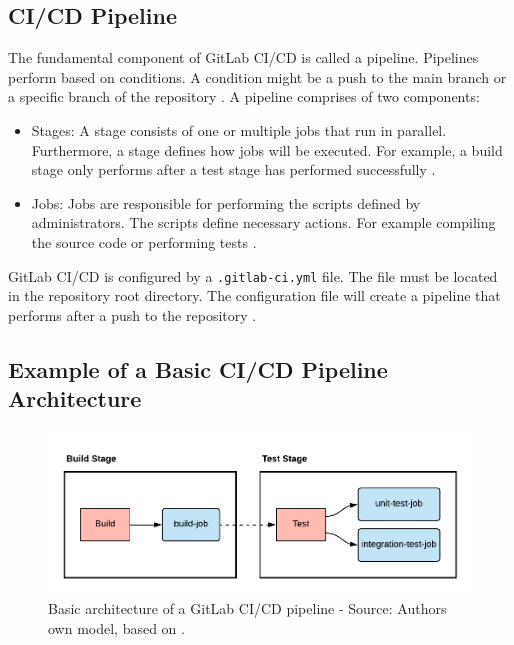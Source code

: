 \subsection{CI/CD Pipeline}
\label{subsec:04_background_gitlab_pipeline}
The fundamental component of GitLab CI/CD is called a pipeline. Pipelines perform based on conditions. A condition might be a push to the main branch or a specific branch of the repository \cite{Gitlab2020Docs}. A pipeline comprises of two components:

\begin{itemize}
\item Stages: A stage consists of one or multiple jobs that run in parallel. Furthermore, a stage defines how jobs will be executed. For example, a build stage only performs after a test stage has performed successfully \cite{Gitlab2020Docs}.

\item Jobs: Jobs are responsible for performing the scripts defined by administrators. The scripts define necessary actions. For example compiling the source code or performing tests \cite{Gitlab2020Docs}.
\end{itemize}


GitLab CI/CD is configured by a \texttt{.gitlab-ci.yml} file. The file must be located in the repository root directory.
The configuration file will create a pipeline that performs after a push to the repository \cite{Gitlab2020Docs}.


\subsection{Example of a Basic CI/CD Pipeline Architecture}
\label{subsec:04_background_gitlab_basic-pipeline}
\begin{figure}[h]
\centering
\includegraphics[scale=0.8]{images/04_technical_background/gitlab/basic_pipeline}
\caption{Basic architecture of a GitLab CI/CD pipeline - Source: Authors own model, based on \cite{Gitlab2020Docs}.}
\label{fig:04_gitlab_pipeline_basic_arch}
\end{figure}


